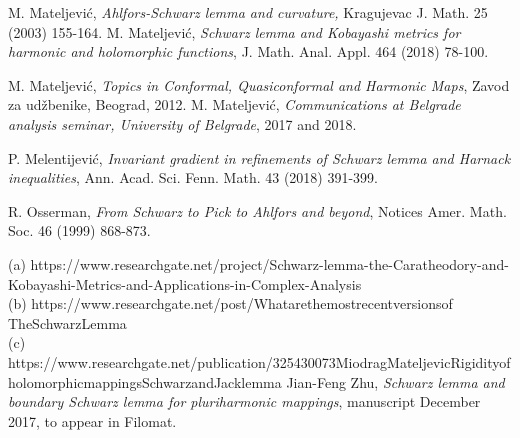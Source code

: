 \documentclass{amsart}
\begin{document}
\begin{thebibliography}{MM}
   M. Mateljevi\' c,  {\it Ahlfors-Schwarz   lemma  and curvature,}
Kragujevac J. Math. 25 (2003)  155-164.
 M. Mateljevi\'c, \emph{Schwarz lemma and Kobayashi metrics for harmonic and holomorphic functions}, J. Math. Anal. Appl. 464 (2018) 78-100.

 M. Mateljevi\'c, \emph{Topics in Conformal, Quasiconformal and Harmonic Maps}, Zavod za ud\v zbenike, Beograd, 2012.
 M. Mateljevi\'{c},  {\it  Communications at Belgrade analysis seminar, University of Belgrade},  2017 and 2018.

 P. Melentijevi\'{c}, \emph{Invariant gradient in refinements of Schwarz lemma and Harnack inequalities}, Ann. Acad. Sci. Fenn. Math. 43 (2018) 391-399.

 R. Osserman, \emph{From Schwarz to Pick to Ahlfors and beyond}, Notices Amer. Math. Soc. 46 (1999) 868-873.

(a) https://www.researchgate.net/project/Schwarz-lemma-the-Caratheodory-and-\\Kobayashi-Metrics-and-Applications-in-Complex-Analysis\\
(b) https://www.researchgate.net/post/What\textunderscore are\textunderscore the\textunderscore most\textunderscore recent\textunderscore versions\textunderscore of\textunderscore\\ The\textunderscore Schwarz\textunderscore Lemma\\
(c) https://www.researchgate.net/publication/325430073\textunderscore Miodrag\textunderscore Mateljevic\textunderscore Rigidity\textunderscore of\textunderscore\\ holomorphic\textunderscore mappings\textunderscore Schwarz\textunderscore and\textunderscore Jack\textunderscore lemma
 Jian-Feng Zhu, {\it Schwarz lemma and boundary Schwarz lemma for pluriharmonic
mappings}, manuscript December  2017, to appear in Filomat.
\end{thebibliography}

\end{document}
